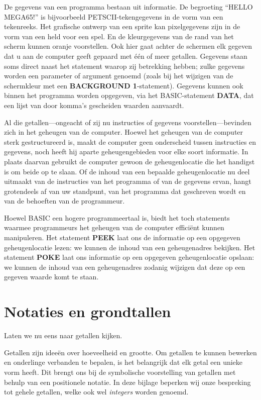 De gegevens van een programma bestaan uit informatie. De begroeting ``HELLO MEGA65!'' is bijvoorbeeld PETSCII-tekengegevens in de vorm van een tekenreeks. Het grafische ontwerp van een sprite kan pixelgegevens zijn in de vorm van een held voor een spel. En de kleurgegevens van de rand van het scherm kunnen oranje voorstellen. Ook hier gaat achter de schermen elk gegeven dat u aan de computer geeft gepaard met één of meer getallen. Gegevens staan soms direct naast het statement waarop zij betrekking hebben; zulke gegevens worden een parameter of argument genoemd (zoals bij het wijzigen van de schermkleur met een {\bf BACKGROUND 1}-statement). Gegevens kunnen ook binnen het programma worden opgegeven, via het BASIC-statement {\bf DATA}, dat een lijst van door komma's gescheiden waarden aanvaardt.

Al die getallen---ongeacht of zij nu instructies of gegevens voorstellen---bevinden zich in het geheugen van de computer. Hoewel het geheugen van de computer sterk gestructureerd is, maakt de computer geen onderscheid tussen instructies en gegevens, noch heeft hij aparte geheugengebieden voor elke soort informatie. In plaats daarvan gebruikt de computer gewoon de geheugenlocatie die het handigst is om beide op te slaan. Of de inhoud van een bepaalde geheugenlocatie nu deel uitmaakt van de instructies van het programma of van de gegevens ervan, hangt grotendeels af van uw standpunt, van het programma dat geschreven wordt en van de behoeften van de programmeur.

Hoewel BASIC een hogere programmeertaal is, biedt het toch statements waarmee programmeurs het geheugen van de computer efficiënt kunnen manipuleren. Het statement {\bf PEEK} laat ons de informatie op een opgegeven geheugenlocatie lezen: we kunnen de inhoud van een geheugenadres bekijken. Het statement {\bf POKE} laat ons informatie op een opgegeven geheugenlocatie opslaan: we kunnen de inhoud van een geheugenadres zodanig wijzigen dat deze op een gegeven waarde komt te staan.

\section{Notaties en grondtallen}Laten we nu eens naar getallen kijken.

Getallen zijn ideeën over hoeveelheid en grootte. Om getallen te kunnen bewerken en onderlinge verbanden te bepalen, is het belangrijk dat elk getal een unieke vorm heeft. Dit brengt ons bij de symbolische voorstelling van getallen met behulp van een positionele notatie. In deze bijlage beperken wij onze bespreking tot gehele getallen, welke ook wel {\it integers} worden genoemd.

